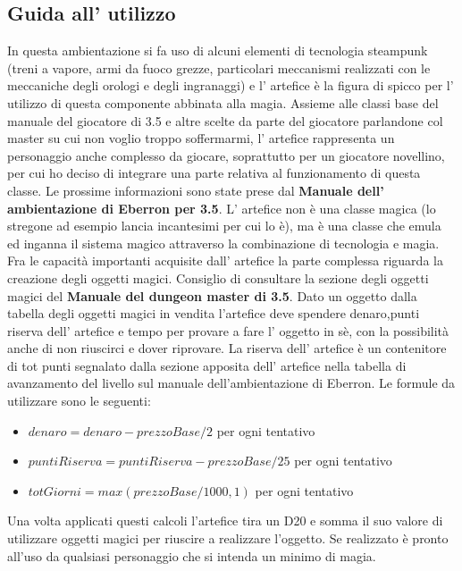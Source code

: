 \documentclass[a4paper,12pt]{book}
\begin{document}
\subsection{Guida all' utilizzo}

In questa ambientazione si fa uso di alcuni elementi di tecnologia steampunk (treni a vapore, armi da fuoco grezze, particolari meccanismi realizzati con le meccaniche degli orologi e degli ingranaggi) e l' artefice è la figura di spicco per l' utilizzo di questa componente abbinata alla magia.
Assieme alle classi base del manuale del giocatore di 3.5 e altre scelte da parte del giocatore parlandone col master su cui non voglio troppo soffermarmi, l' artefice rappresenta un personaggio anche complesso da giocare, soprattutto per un giocatore novellino, per cui ho deciso di integrare una parte relativa al funzionamento di questa classe.
Le prossime informazioni sono state prese dal \textbf{Manuale dell' ambientazione di Eberron per 3.5}.
L' artefice non è una classe magica (lo stregone ad esempio lancia incantesimi per cui lo è), ma è una classe che emula ed inganna il sistema magico attraverso la combinazione di tecnologia e magia.
Fra le capacità importanti acquisite dall' artefice la parte complessa riguarda la creazione degli oggetti magici.
Consiglio di consultare la sezione degli oggetti magici del \textbf{Manuale del dungeon master di 3.5}.
Dato un oggetto dalla tabella degli oggetti magici in vendita l'artefice deve spendere denaro,punti riserva dell' artefice e tempo per provare a fare l' oggetto in sè, con la possibilità anche di non riuscirci e dover riprovare.
La riserva dell' artefice è un contenitore di tot punti segnalato dalla sezione apposita dell' artefice nella tabella di avanzamento del livello sul manuale dell'ambientazione di Eberron.
Le formule da utilizzare sono le seguenti:

\begin{itemize}

\item{ $denaro = denaro - prezzoBase / 2$ per ogni tentativo}
\item{ $puntiRiserva = puntiRiserva - prezzoBase / 25$ per ogni tentativo}
\item{ $totGiorni =  max( prezzoBase/1000 , 1)$ per ogni tentativo}

\end{itemize}

Una volta applicati questi calcoli l'artefice tira un D20 e somma il suo valore di  utilizzare oggetti magici per riuscire a realizzare l'oggetto.
Se realizzato è pronto all'uso da qualsiasi personaggio che si intenda un minimo di magia.
\end{document}
